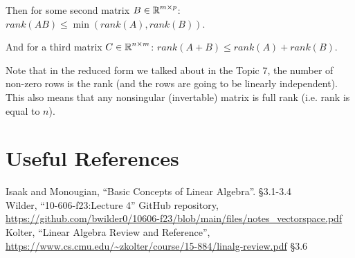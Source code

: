 Then for some second matrix $B\in\operatorname{\mathbb{R}}^{m\times p}$: $rank(AB) \le \min(rank(A),rank(B))$. 

And for a third matrix $C\in\operatorname{\mathbb{R}}^{n\times m}$: $rank(A + B) \le rank(A) + rank(B).$

Note that in the reduced form we talked about in the Topic 7, the number of non-zero rows is the rank (and the rows are going to be linearly independent). 
This also means that any nonsingular (invertable) matrix is full rank (i.e. rank is equal to $n$). 

\section*{Useful References}
Isaak and Monougian, ``Basic Concepts of Linear Algebra''. \S 3.1-3.4\\
Wilder, ``10-606-f23:Lecture 4'' GitHub repository, \url{https://github.com/bwilder0/10606-f23/blob/main/files/notes_vectorspace.pdf}\\
Kolter, ``Linear Algebra Review and Reference'', \url{https://www.cs.cmu.edu/~zkolter/course/15-884/linalg-review.pdf} \S3.6


